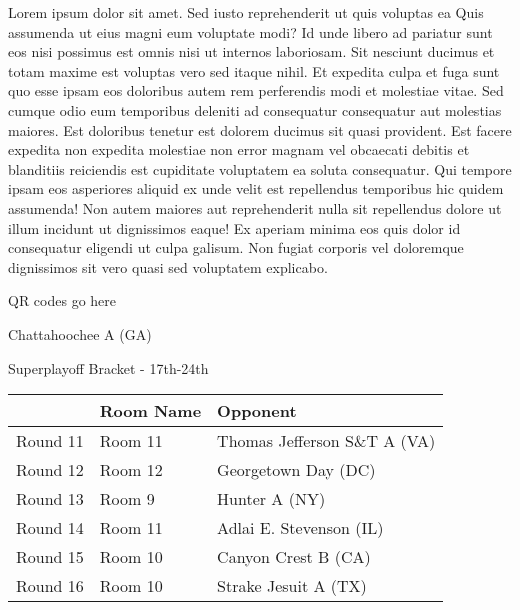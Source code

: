 \documentclass{article}%
\begin{document}
\vspace*{8pt}%
\linebreak%
\newline%
\newline%
    Lorem ipsum dolor sit amet. Sed iusto reprehenderit ut quis voluptas ea Quis assumenda ut eius magni eum voluptate modi? Id unde libero ad pariatur sunt eos nisi possimus est omnis nisi ut internos laboriosam. Sit nesciunt ducimus et totam maxime est voluptas vero sed itaque nihil. Et expedita culpa et fuga sunt quo esse ipsam eos doloribus autem rem perferendis modi et molestiae vitae.\newline%
\newline%
    Sed cumque odio eum temporibus deleniti ad consequatur consequatur aut molestias maiores. Est doloribus tenetur est dolorem ducimus sit quasi provident. Est facere expedita non expedita molestiae non error magnam vel obcaecati debitis et blanditiis reiciendis est cupiditate voluptatem ea soluta consequatur. Qui tempore ipsam eos asperiores aliquid ex unde velit est repellendus temporibus hic quidem assumenda!\newline%
\newline%
    Non autem maiores aut reprehenderit nulla sit repellendus dolore ut illum incidunt ut dignissimos eaque! Ex aperiam minima eos quis dolor id consequatur eligendi ut culpa galisum. Non fugiat corporis vel doloremque dignissimos sit vero quasi sed voluptatem explicabo.\newline%
\newline%
\vspace*{30pt}%
\begin{center}%
\begin{Huge}%
QR codes go here%
\end{Huge}%
\end{center}%
\newpage%
\begin{center}%
\begin{Huge}%
Chattahoochee A (GA)%
\end{Huge}%
\vspace*{8pt}%
\linebreak%
\begin{Large}%
Superplayoff Bracket {-} 17th{-}24th%
\end{Large}%
\end{center}%
%
\begin{tabularx}{\textwidth}{|c|Y|Y|}%
\hline%
&Room Name&Opponent\\%
\hline%
Round 11&Room 11&Thomas Jefferson S\&T A (VA)\\%
Round 12&Room 12&Georgetown Day (DC)\\%
Round 13&Room 9&Hunter A (NY)\\%
Round 14&Room 11&Adlai E. Stevenson (IL)\\%
Round 15&Room 10&Canyon Crest B (CA)\\%
Round 16&Room 10&Strake Jesuit A (TX)\\%
\hline%
\end{tabularx}%
\end{document}
